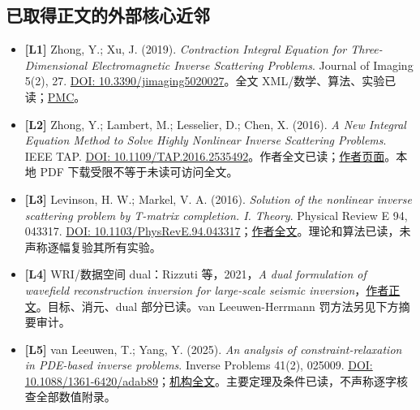 \documentclass[10pt,a4paper]{article}
\providecommand{\tightlist}{\setlength{\itemsep}{0pt}\setlength{\parskip}{0pt}}
\begin{document}
\hypertarget{ux5df2ux53d6ux5f97ux6b63ux6587ux7684ux5916ux90e8ux6838ux5fc3ux8fd1ux90bb}{%
\subsection{已取得正文的外部核心近邻}\label{ux5df2ux53d6ux5f97ux6b63ux6587ux7684ux5916ux90e8ux6838ux5fc3ux8fd1ux90bb}}

\begin{itemize}
\tightlist
\item
  \textbf{{[}L1{]}} Zhong, Y.; Xu, J. (2019). \emph{Contraction Integral
  Equation for Three-Dimensional Electromagnetic Inverse Scattering
  Problems}. Journal of Imaging 5(2), 27.
  \href{https://doi.org/10.3390/jimaging5020027}{DOI:
  10.3390/jimaging5020027}。全文
  XML/数学、算法、实验已读；\href{https://pmc.ncbi.nlm.nih.gov/articles/PMC8320915/}{PMC}。
\item
  \textbf{{[}L2{]}} Zhong, Y.; Lambert, M.; Lesselier, D.; Chen, X.
  (2016). \emph{A New Integral Equation Method to Solve Highly Nonlinear
  Inverse Scattering Problems}. IEEE TAP.
  \href{https://doi.org/10.1109/TAP.2016.2535492}{DOI:
  10.1109/TAP.2016.2535492}。作者全文已读；\href{https://www.researchgate.net/publication/296475773_A_New_Integral_Equation_Method_to_Solve_Highly_Nonlinear_Inverse_Scattering_Problems}{作者页面}。本地
  PDF 下载受限不等于未读可访问全文。
\item
  \textbf{{[}L3{]}} Levinson, H. W.; Markel, V. A. (2016).
  \emph{Solution of the nonlinear inverse scattering problem by T-matrix
  completion. I. Theory}. Physical Review E 94, 043317.
  \href{https://doi.org/10.1103/PhysRevE.94.043317}{DOI:
  10.1103/PhysRevE.94.043317}；\href{https://arxiv.org/abs/1401.3319}{作者全文}。理论和算法已读，未声称逐幅复验其所有实验。
\item
  \textbf{{[}L4{]}} WRI/数据空间 dual：Rizzuti 等，2021，\emph{A dual
  formulation of wavefield reconstruction inversion for large-scale
  seismic
  inversion}，\href{https://slim.gatech.edu/Publications/Public/Journals/Geophysics/2021/rizzuti2020dfw/rizzuti2020dfw.html}{作者正文}。目标、消元、dual
  部分已读。van Leeuwen-Herrmann 罚方法另见下方摘要审计。
\item
  \textbf{{[}L5{]}} van Leeuwen, T.; Yang, Y. (2025). \emph{An analysis
  of constraint-relaxation in PDE-based inverse problems}. Inverse
  Problems 41(2), 025009.
  \href{https://doi.org/10.1088/1361-6420/adab89}{DOI:
  10.1088/1361-6420/adab89}；\href{https://ir.cwi.nl/pub/34830/34830.pdf}{机构全文}。主要定理及条件已读，不声称逐字核查全部数值附录。

\end{itemize}
\end{document}

